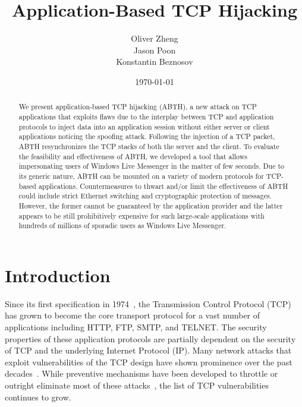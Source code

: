 \documentclass{sig-alternate}
\begin{document}

\title{
Application-Based TCP Hijacking
}

\author {
	\alignauthor
	Oliver Zheng\\
	\alignauthor
	Jason Poon\\
	\alignauthor
	Konstantin Beznosov\\
}

\date{\today}

\maketitle

\begin{abstract}
We present application-based TCP hijacking (ABTH), a new attack on TCP applications that exploits flaws due to the interplay between TCP and application protocols to inject data into an application session without either server or client applications noticing the spoofing attack. 
Following the injection of a TCP packet, ABTH resynchronizes the TCP stacks of both the server and the client.
To evaluate the feasibility and effectiveness of ABTH, we developed a tool that allows impersonating users of Windows Live Messenger in the matter of few seconds. 
Due to its generic nature, ABTH can be mounted on a variety of modern protocols for TCP-based applications.
Countermeasures to thwart and/or limit the effectiveness of ABTH could include strict Ethernet switching and cryptographic protection of messages.
However, the former cannot be guaranteed by the application provider and the latter appears to be still prohibitively expensive for such large-scale applications with hundreds of millions of sporadic users as Windows Live Messenger.
\end{abstract}



\section{Introduction}

Since its first specification in 1974~\cite{rfc:tcp}, the Transmission Control Protocol (TCP) has grown to become the core transport protocol for a vast number of applications including HTTP, FTP, SMTP, and TELNET.
The security properties of these application protocols are partially dependent on the security of TCP and the underlying Internet Protocol (IP).
Many network attacks that exploit vulnerabilities of the TCP design have shown prominence over the past decades~\cite{harris:tcpattacks}.
While preventive mechanisms have been developed to throttle or outright eliminate most of these attacks~\cite{dubrawsky:layer2}, the list of TCP vulnerabilities continues to grow.
\end{document}
